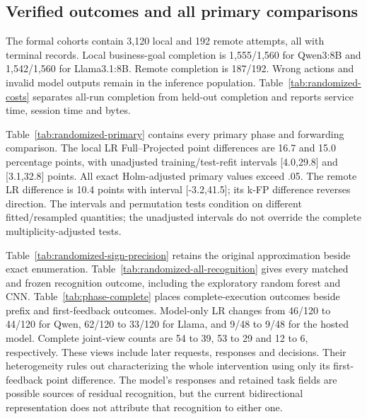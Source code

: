 \subsection{Verified outcomes and all primary comparisons}
The formal cohorts contain 3,120 local and 192 remote attempts, all with terminal records. Local business-goal completion is 1,555/1,560 for Qwen3:8B and 1,542/1,560 for Llama3.1:8B. Remote completion is 187/192. Wrong actions and invalid model outputs remain in the inference population. Table~\ref{tab:randomized-costs} separates all-run completion from held-out completion and reports service time, session time and bytes.

Table~\ref{tab:randomized-primary} contains every primary phase and forwarding comparison. The local LR Full--Projected point differences are 16.7 and 15.0 percentage points, with unadjusted training/test-refit intervals [4.0,29.8] and [3.1,32.8] points. All exact Holm-adjusted primary values exceed .05. The remote LR difference is 10.4 points with interval [-3.2,41.5]; its k-FP difference reverses direction. The intervals and permutation tests condition on different fitted/resampled quantities; the unadjusted intervals do not override the complete multiplicity-adjusted tests.

Table~\ref{tab:randomized-sign-precision} retains the original approximation beside exact enumeration. Table~\ref{tab:randomized-all-recognition} gives every matched and frozen recognition outcome, including the exploratory random forest and CNN. Table~\ref{tab:phase-complete} places complete-execution outcomes beside prefix and first-feedback outcomes. Model-only LR changes from 46/120 to 44/120 for Qwen, 62/120 to 33/120 for Llama, and 9/48 to 9/48 for the hosted model. Complete joint-view counts are 54 to 39, 53 to 29 and 12 to 6, respectively. These views include later requests, responses and decisions. Their heterogeneity rules out characterizing the whole intervention using only its first-feedback point difference. The model's responses and retained task fields are possible sources of residual recognition, but the current bidirectional representation does not attribute that recognition to either one.

